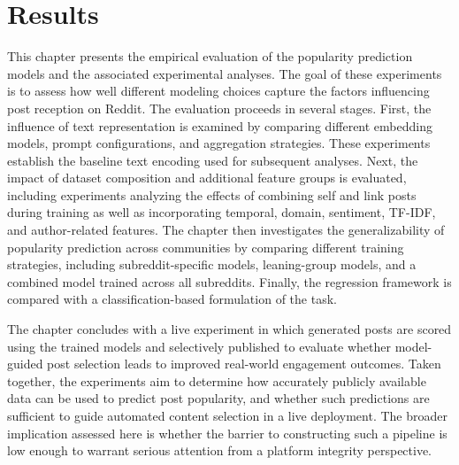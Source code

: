 

\chapter{Results}
\label{chap:results}

This chapter presents the empirical evaluation of the popularity prediction models and the associated experimental analyses. The goal of these experiments is to assess how well different modeling choices capture the factors influencing post reception on Reddit. The evaluation proceeds in several stages. First, the influence of text representation is examined by comparing different embedding models, prompt configurations, and aggregation strategies. These experiments establish the baseline text encoding used for subsequent analyses. Next, the impact of dataset composition and additional feature groups is evaluated, including experiments analyzing the effects of combining self and link posts during training as well as incorporating temporal, domain, sentiment, TF-IDF, and author-related features. The chapter then investigates the generalizability of popularity prediction across communities by comparing different training strategies, including subreddit-specific models, leaning-group models, and a combined model trained across all subreddits. Finally, the regression framework is compared with a classification-based formulation of the task.

The chapter concludes with a live experiment in which generated posts are scored using the trained models and selectively published to evaluate whether model-guided post selection leads to improved real-world engagement outcomes. Taken together, the experiments aim to determine how accurately publicly available data can be used to predict post popularity, and whether such predictions are sufficient to guide automated content selection in a live deployment. The broader implication assessed here is whether the barrier to constructing such a pipeline is low enough to warrant serious attention from a platform integrity perspective.

